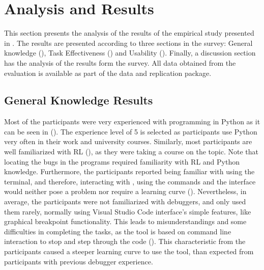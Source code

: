
\section{Analysis and Results}
\label{sec:results}

This section presents the analysis of the results of the empirical study presented in 
. The results are presented according to three sections in the survey: General 
knowledge (), Task Effectiveness () and Usability 
(). Finally, a discussion section has the analysis of the results form the survey. All 
data obtained from the evaluation is available as part of the data and replication package.


\subsection{General Knowledge Results}
\label{sec:general-knowledge}

Most of the participants were very experienced with programming in Python as it can be seen in 
(). The experience level of 5 is selected as participants use Python very 
often in their work and university courses. Similarly, most participants are well familiarized with 
\ac{RL} (), as they were taking a course on the topic. Note that locating the 
bugs in the programs required familiarity with \ac{RL} and Python knowledge. Furthermore, the 
participants reported being familiar  with using the terminal, and therefore, interacting with \flik, using 
the commands and the interface would neither pose a problem nor require a learning curve 
(). Nevertheless, in average, the participants were not familiarized with 
debuggers, and only used them  rarely, normally using Visual Studio Code interface's simple 
features, like graphical breakpoint functionality. This leads to misunderstandings and some difficulties 
in completing the tasks, as the  tool is based on command line interaction to stop and step through 
the code (). This characteristic from the participants caused a steeper 
learning curve to use the tool, than expected from participants with previous debugger experience.

